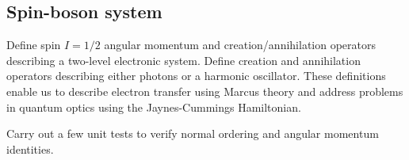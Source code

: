 \subsection{Spin-boson system}

Define spin $I = 1/2$ angular momentum and creation/annihilation operators describing a two-level electronic system.
Define creation and annihilation operators describing either photons or a harmonic oscillator.
These definitions enable us to describe electron transfer using Marcus theory and address problems in quantum optics using the Jaynes-Cummings Hamiltonian.



Carry out a few unit tests to verify normal ordering and angular momentum identities.

